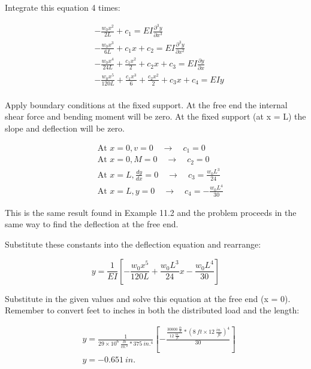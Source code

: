 \documentclass[
  letterpaper,
  DIV=11,
  numbers=noendperiod]{scrreprt}
\theoremstyle{definition}
\theoremstyle{remark}
\begin{document}
\begin{tcolorbox}
\begin{tcolorbox}
Integrate this equation 4 times:

\[
\begin{aligned} & -\frac{w_0 x^2}{2 L}+c_1=E I \frac{\partial^3 y}{\partial x^3} \\ & -\frac{w_0 x^3}{6 L}+c_1 x+c_2=EI\frac{\partial^3 y}{\partial x^2} \\ & -\frac{w_0 x^4}{24 L}+\frac{c_1 x^2}{2}+c_2 x+c_3=E I \frac{\partial y}{\partial x} \\ & -\frac{w_0 x^5}{120L}+\frac{c_1 x^3}{6}+\frac{c_2 x^2}{2}+c_3 x+c_4=EIy \\ & \end{aligned}
\]

Apply boundary conditions at the fixed support. At the free end the
internal shear force and bending moment will be zero. At the fixed
support (at x = L) the slope and deflection will be zero.

\[
\begin{aligned} &\text { At } x=0, v=0 \quad \rightarrow \quad c_1=0 \\ &\text { At } x=0, M=0 \quad \rightarrow \quad c_2=0 \\ &\text { At } x=L, \frac{d y}{d x}=0 \quad \rightarrow \quad c_3=\frac{w_0 L^3}{24} \\ &\text { At } x=L, y=0 \quad \rightarrow \quad c_4=-\frac{w_0L^4}{30} \end{aligned}
\]

This is the same result found in Example 11.2 and the problem proceeds
in the same way to find the deflection at the free end.

Substitute these constants into the deflection equation and rearrange:

\[
y=\frac{1}{E I}\left[-\frac{w_0 x^5}{120L}+\frac{w_0 L^3}{24} x-\frac{w_0 L^4}{30}\right]
\]

Substitute in the given values and solve this equation at the free end
(x = 0). Remember to convert feet to inches in both the distributed load
and the length:

\[
\begin{aligned}
& y=\frac{1}{29 \times 10^6~\frac{lb}{in.^2}*375{~in.^4}} \left[-\frac{\frac{30000~\frac{lb}{ft}}{12~\frac{in.}{ft}}*(8{~ft}\times12~\frac{in.}{ft})^4}{30}\right] \\
& y=- 0.651{~in.}\end{aligned}
\]

\end{tcolorbox}

\end{tcolorbox}
\end{document}
